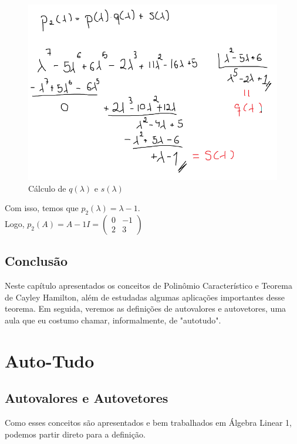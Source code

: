 \documentclass[12pt]{article}
\begin{document}
	\begin{figure}[H]
		\centering
		\includegraphics[width=1\linewidth]{Imagens/aplicacao2}
		\caption{Cálculo de $q(\lambda)$ e $s(\lambda)$}
		\label{fig:aplicacao2}
	\end{figure}
	
	Com isso, temos que $p_2(\lambda)=\lambda-1$.\\
	
	Logo,  $p_2(A)=A-1I=\begin{pmatrix}
		0 & -1 \\
		2 & 3
	\end{pmatrix}
	$
	
	\subsection{Conclusão}
	Neste capítulo apresentados os conceitos de  Polinômio Característico e Teorema de Cayley Hamilton, além de estudadas algumas aplicações importantes desse teorema. Em seguida, veremos as definições de autovalores e autovetores, uma aula que eu costumo chamar, informalmente, de "autotudo".
	
	\section{Auto-Tudo}
	
	\subsection{Autovalores e Autovetores}
	
	Como esses conceitos são apresentados e bem trabalhados em Álgebra Linear 1, podemos partir direto para a definição.\\
	
\end{document}
